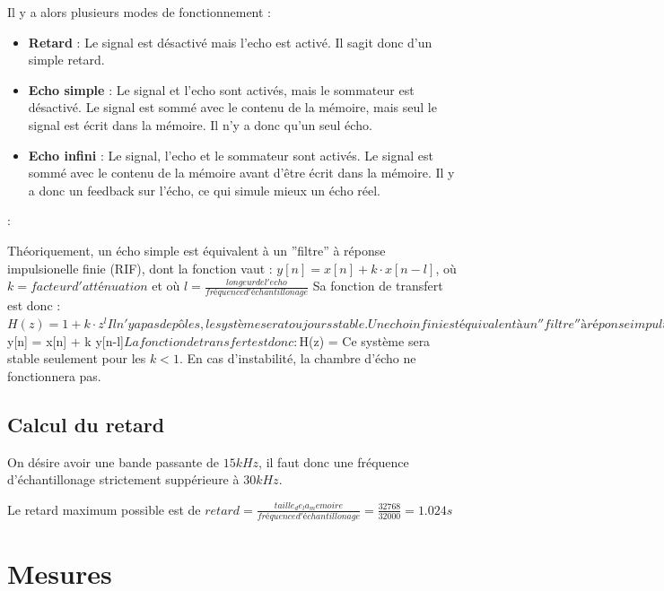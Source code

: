 \documentclass{article}
\begin{document}
Il y a alors plusieurs modes de fonctionnement :
\begin{itemize}
\item \textbf{Retard} : Le signal est désactivé mais l'echo est activé. Il sagit donc d'un simple retard.
\item \textbf{Echo simple} : Le signal et l'echo sont activés, mais le sommateur est désactivé. Le signal est sommé avec le contenu de la mémoire, mais seul le signal est écrit dans la mémoire. Il n'y a donc qu'un seul écho.
\item \textbf{Echo infini} : Le signal, l'echo et le sommateur sont activés. Le signal est sommé avec le contenu de la mémoire avant d'être écrit dans la mémoire. Il y a donc un feedback sur l'écho, ce qui simule mieux un écho réel.
\end{itemize} :

Théoriquement, un écho simple est équivalent à un ''filtre'' à réponse impulsionelle finie (RIF), dont la fonction vaut :
$y[n] = x[n] + k \cdot x[n-l]$, où $k = facteur d'atténuation$ et où $l = \frac{longeur de l'echo}{fréquence d'échantillonage}$
Sa fonction de transfert est donc :
$H(z) = 1 + k \cdot z^l

Il n'y a pas de pôles, le système sera toujours stable.

Un echo infini est équivalent à un ''filtre'' à réponse impultionelle infinie (RII), dont la fonction vaut :
$y[n] = x[n] + k \cdot y[n-l]$

La fonction de transfert est donc :
$H(z) = 
Ce système sera stable seulement pour les $k<1$. En cas d'instabilité, la chambre d'écho ne fonctionnera pas.

\subsection{Calcul du retard}
On désire avoir une bande passante de $15 kHz$, il faut donc une fréquence d'échantillonage strictement suppérieure à $30 kHz$.

Le retard maximum possible est de $retard = \frac{taille_de_la_memoire}{fréquence d'échantillonage} = \frac{32768}{32000} = 1.024 s$



\section{Mesures}
\end{document}
